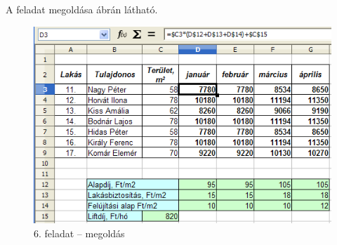 A feladat megoldása  ábrán látható.

\begin{figure}[!h]
\begin{center}
\includegraphics[width=13.386cm]{oocalcv1-img31.png}
\caption{6. feladat --  megoldás}\label{6-feladatMegoldás}
\end{center}
\end{figure}

